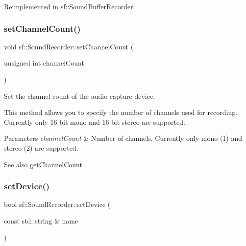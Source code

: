 Reimplemented in \hyperlink{classsf_1_1_sound_buffer_recorder_ab8e53849312413431873a5869d509f1e}{sf\+::\+Sound\+Buffer\+Recorder}.

\mbox{\label{classsf_1_1_sound_recorder_ae4e22ba67d12a74966eb05fad55a317c}} 
\subsubsection{\texorpdfstring{set\+Channel\+Count()}{setChannelCount()}}
{\footnotesize\ttfamily void sf\+::\+Sound\+Recorder\+::set\+Channel\+Count (\begin{DoxyParamCaption}\item[{unsigned int}]{channel\+Count }\end{DoxyParamCaption})}



Set the channel count of the audio capture device. 

This method allows you to specify the number of channels used for recording. Currently only 16-\/bit mono and 16-\/bit stereo are supported.


\begin{DoxyParams}{Parameters}
{\em channel\+Count} & Number of channels. Currently only mono (1) and stereo (2) are supported.\\
\hline
\end{DoxyParams}
\begin{DoxySeeAlso}{See also}
\hyperlink{classsf_1_1_sound_recorder_a610e98e7a73b316ce26b7c55234f86e9}{get\+Channel\+Count} 
\end{DoxySeeAlso}
\mbox{\label{classsf_1_1_sound_recorder_a8eb3e473292c16e874322815836d3cd3}} 
\subsubsection{\texorpdfstring{set\+Device()}{setDevice()}}
{\footnotesize\ttfamily bool sf\+::\+Sound\+Recorder\+::set\+Device (\begin{DoxyParamCaption}\item[{const std\+::string \&}]{name }\end{DoxyParamCaption})}



